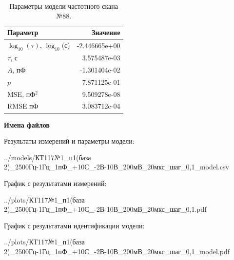 \begin{table}[!ht]
    \centering
    \caption{Параметры модели частотного скана №88.}
    \begin{tabular}{|l|r|}
        \hline
        Параметр                                       & Значение                  \\ \hline
        $\log_{10}(\tau)$, $\log_{10}$(с)              & -2.446665e+00             \\ \hline
        $\tau$, с                                      & 3.575487e-03              \\ \hline
        $A$, пФ                                        & -1.301404e-02             \\ \hline
        $p$                                            & 7.871125e-01              \\ \hline
        MSE, пФ$^2$                                    & 9.509278e-08              \\ \hline
        RMSE пФ                                        & 3.083712e-04              \\ \hline
    \end{tabular}
    \label{table:frequency_scan_model_88}
\end{table}

\textbf{Имена файлов}

Результаты измерений и параметры модели:

\scriptsize../models/КТ117№1\_п1(база 2)\_2500Гц-1Гц\_1пФ\_+10С\_-2В-10В\_200мВ\_20мкс\_шаг\_0,1\_model.csv
\normalsize

График с результатами измерений:

\scriptsize../plots/КТ117№1\_п1(база 2)\_2500Гц-1Гц\_1пФ\_+10С\_-2В-10В\_200мВ\_20мкс\_шаг\_0,1.pdf
\normalsize

График с результатами идентификации модели:

\scriptsize../plots/КТ117№1\_п1(база 2)\_2500Гц-1Гц\_1пФ\_+10С\_-2В-10В\_200мВ\_20мкс\_шаг\_0,1\_model.pdf
\normalsize

